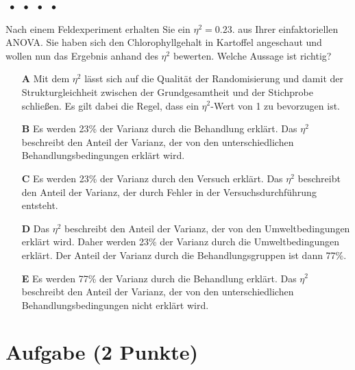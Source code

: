 \documentclass[a4paper, 9pt]{scrartcl}\usepackage[]{graphicx}\usepackage[]{xcolor}
\begin{document}
\ifcollection
\begin{flushright}
\tiny\vspace{-2Ex}
\textbf{\examinhaltstart}
\exammodulemathstat $\;\bullet$
\exammodulestat $\;\bullet$
\exammodulestatbbv $\;\bullet$
\exammodulestatversuch $\;\bullet$
\exammodulebiostat
\vspace{-1Ex}
\end{flushright}
\fi







Nach einem Feldexperiment erhalten Sie ein $\eta^2 = 0.23$. aus Ihrer einfaktoriellen ANOVA. Sie haben sich den Chlorophyllgehalt in Kartoffel angeschaut und wollen nun das Ergebnis anhand des $\eta^2$ bewerten. Welche Aussage ist richtig?



\begin{enumerate}
\item [\textbf{A} \msquare] Mit dem $\eta^2$ lässt sich auf die Qualität der Randomisierung und damit der Strukturgleichheit zwischen der Grundgesamtheit und der Stichprobe schließen. Es gilt dabei die Regel, dass ein $\eta^2$-Wert von 1 zu bevorzugen ist.
\item [\textbf{B} \msquare] Es werden 23\% der Varianz durch die Behandlung erklärt. Das $\eta^2$ beschreibt den Anteil der Varianz, der von den unterschiedlichen Behandlungsbedingungen erklärt wird.
\item [\textbf{C} \msquare] Es werden 23\% der Varianz durch den Versuch erklärt. Das $\eta^2$ beschreibt den Anteil der Varianz, der durch Fehler in der Versuchsdurchführung entsteht.
\item [\textbf{D} \msquare] Das $\eta^2$ beschreibt den Anteil der Varianz, der von den Umweltbedingungen erklärt wird. Daher werden 23\% der Varianz durch die Umweltbedingungen erklärt. Der Anteil der Varianz durch die Behandlungsgruppen ist dann 77\%.
\item [\textbf{E} \msquare] Es werden 77\% der Varianz durch die Behandlung erklärt. Das $\eta^2$ beschreibt den Anteil der Varianz, der von den unterschiedlichen Behandlungsbedingungen nicht erklärt wird.
\end{enumerate}

\section{Aufgabe \hfill (2 Punkte)}
\end{document}
